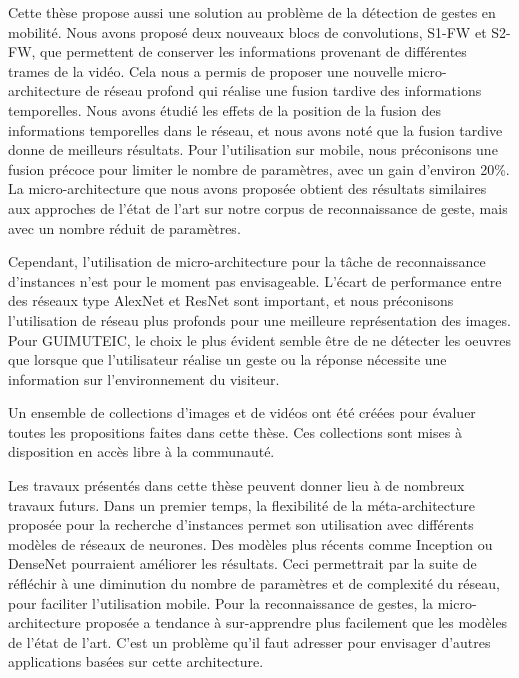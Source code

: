 Cette thèse propose aussi une solution au problème de la détection de gestes en mobilité. Nous avons proposé deux nouveaux blocs de convolutions, S1-FW et S2-FW, que permettent de conserver les informations provenant de différentes trames de la vidéo.
Cela nous a permis de proposer une nouvelle micro-architecture de réseau profond qui réalise une fusion tardive des informations temporelles.
Nous avons étudié les effets de la position de la fusion des informations temporelles dans le réseau, et nous avons noté que la fusion tardive donne de meilleurs résultats.
Pour l'utilisation sur mobile, nous préconisons une fusion précoce pour limiter le nombre de paramètres, avec un gain d’environ 20\%.
La micro-architecture que nous avons proposée obtient des résultats similaires aux approches de l'état de l'art sur notre corpus de reconnaissance de geste, mais avec un nombre réduit de paramètres.

Cependant, l’utilisation  de micro-architecture pour la tâche de reconnaissance d’instances n’est pour le moment pas envisageable.
L’écart de performance entre des réseaux type AlexNet et ResNet sont important, et nous préconisons l’utilisation de réseau plus profonds pour une meilleure représentation des images.
Pour GUIMUTEIC, le choix le plus évident semble être de ne détecter les oeuvres que lorsque que l'utilisateur réalise un geste ou la réponse nécessite une information sur l'environnement du visiteur.

Un ensemble de collections d’images et de vidéos ont été créées pour évaluer toutes les propositions faites dans cette thèse.
Ces collections sont mises à disposition en accès libre à la communauté.

Les travaux présentés dans cette thèse peuvent donner lieu à de nombreux travaux futurs.
Dans un premier temps, la flexibilité de la méta-architecture proposée pour la recherche d’instances permet son utilisation avec différents modèles de réseaux de neurones. Des modèles plus récents comme Inception ou DenseNet pourraient améliorer les résultats.
Ceci permettrait par la suite de réfléchir à une diminution du nombre de paramètres et de complexité du réseau, pour faciliter l’utilisation mobile. 
Pour la reconnaissance de gestes, la micro-architecture proposée a tendance à sur-apprendre plus facilement que les modèles de l'état de l'art.
C’est un problème qu’il faut adresser pour envisager d’autres applications basées sur cette architecture.

